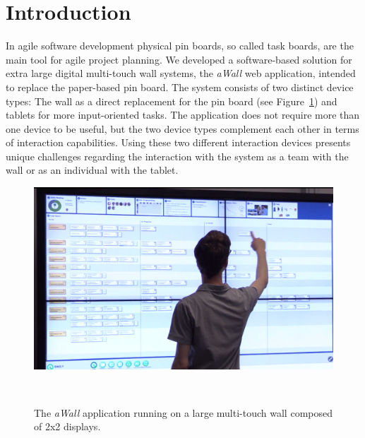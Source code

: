 \documentclass{sigchi}
\begin{document}



\section{Introduction}
In agile software development physical pin boards, so called task boards, are the main tool for agile project planning. We developed a software-based solution for extra large digital multi-touch wall systems, the \textit{aWall} web application, intended to replace the paper-based pin board.
The system consists of two distinct device types: The wall as a direct replacement for the pin board (see Figure~\ref{fig:awall}) and tablets for more input-oriented tasks.
The application does not require more than one device to be useful, but the two device types complement each other in terms of interaction capabilities.
Using these two different interaction devices presents unique challenges regarding the interaction with the system as a team with the wall or as an individual with the tablet.

\begin{figure}
	\centering
	\includegraphics[width=\columnwidth]{figures/awall}
	\caption{The \textit{aWall} application running on a large multi-touch wall composed of 2x2 displays.}
	~\label{fig:awall}
\end{figure}
\end{document}
